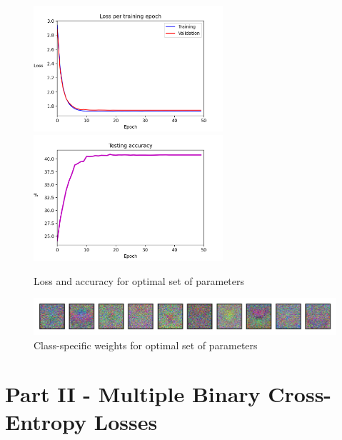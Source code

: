 \documentclass{article}
\begin{document}
	\begin{figure}[h!]
		\centering
		\includegraphics[width=7cm]{../plots/loss_v5.png}
		\includegraphics[width=7cm]{../plots/acc_v5.png}
		\caption{Loss and accuracy for optimal set of parameters}
		\vspace{0.2cm}
		\includegraphics[width=12cm]{../plots/weights_v5.png}
		\caption{Class-specific weights for optimal set of parameters}
	\end{figure}


\newpage
\section*{Part II - Multiple Binary Cross-Entropy Losses}
\vspace{0.5cm}
\end{document}
